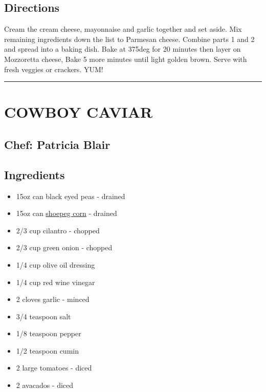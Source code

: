 \documentclass[
]{book}
\providecommand{\tightlist}{%
  \setlength{\itemsep}{0pt}\setlength{\parskip}{0pt}}
\begin{document}
\hypertarget{directions}{%
\subsection*{Directions}\label{directions}}

Cream the cream cheese, mayonnaise and garlic together and set aside.
Mix remaining ingredients down the list to Parmesan cheese.
Combine parts 1 and 2 and spread into a baking dish.
Bake at 375deg for 20 minutes then layer on Mozzoretta cheese,
Bake 5 more minutes until light golden brown.
Serve with fresh veggies or crackers.
YUM!

\begin{center}\rule{0.5\linewidth}{0.5pt}\end{center}

\hypertarget{cowboy-caviar}{%
\section*{COWBOY CAVIAR}\label{cowboy-caviar}}

\hypertarget{chef-patricia-blair}{%
\subsection*{Chef: Patricia Blair}\label{chef-patricia-blair}}

\hypertarget{ingredients-1}{%
\subsection*{Ingredients}\label{ingredients-1}}

\begin{itemize}
\tightlist
\item
  15oz can black eyed peas - drained
\item
  15oz can \href{https://en.wikipedia.org/wiki/Shoepeg_corn}{shoepeg corn} - drained
\item
  2/3 cup cilantro - chopped
\item
  2/3 cup green onion - chopped
\item
  1/4 cup olive oil dressing
\item
  1/4 cup red wine vinegar
\item
  2 cloves garlic - minced
\item
  3/4 teaspoon salt
\item
  1/8 teaspoon pepper
\item
  1/2 teaspoon cumin
\item
  2 large tomatoes - diced
\item
  2 avacados - diced
\end{itemize}
\end{document}
